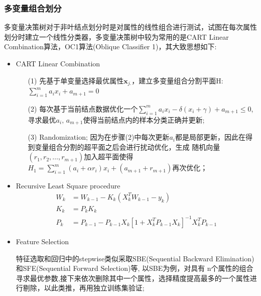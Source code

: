 \documentclass[a4paper]{article}
\begin{document}
	    \subsubsection{多变量组合划分}
	    	多变量决策树对于非叶结点划分时是对属性的线性组合进行测试，试图在每次属性划分时建立一个线性分类器，多变量决策树中较为常用的是CART Linear Combination算法，OC1算法(Oblique Classifier 1)，其大致思想如下:
				\begin{itemize}
					\item 	CART Linear Combination\par
						\begin{itemize}
							\item[(1)] 先基于单变量选择最优属性$\textbf{x}_{j.}$，建立多变量组合分割平面H: $\sum_{i=1}^{m}a_ix_i+a_{m+1}=0$
							\item[(2)] 每次基于当前结点数据优化一个$\sum_{i=1}^{m}a_ix_i-\delta\left(x_i+\gamma\right)+a_{m+1}\leq0$,寻求最优$a_i,\,a_{m+1}$使得当前结点内的样本分类正确并更新;
							\item[(3)] Randomization; 因为在步骤(2)中每次更新$a_i$都是局部更新，因此在得到变量组合分割的超平面之后会进行扰动优化，生成
							随机向量$(r_1,r_2,\dots, r_{m+1})$加入超平面使得$H_1 = \sum_{i=1}^{m}\left(a_i+\alpha r_i\right)x_i+\left(a_{m+1}+r_{m+1}\right)$再次优化；
						\end{itemize}
					\item 	Recursive Least Square procedure
						\begin{align*}
						  	W_k &= W_{k-1}-K_k\left(X_k^TW_{k-1}-y_k\right)\\
						  	K_k &= P_kK_k\\
						  	P_k &= P_{k-1} - P_{k-1}X_k\left[1+X_k^TP_{k-1}X_k\right]^{-1}X_k^TP_{k-1}
						\end{align*}
					\item 	Feature Selection\par
						特征选取和回归中的stepwise类似采取SBE(Sequential Backward Elimination) 和SFE(Sequential Forward Selection)等, 以SBE为例，对具有
						n个属性的组合寻求最优参数,接下来依次删除其中一个属性，选择精度提高最多的一个属性进行剔除，以此类推，再用独立训练集验证;
				\end{itemize}
\end{document}
